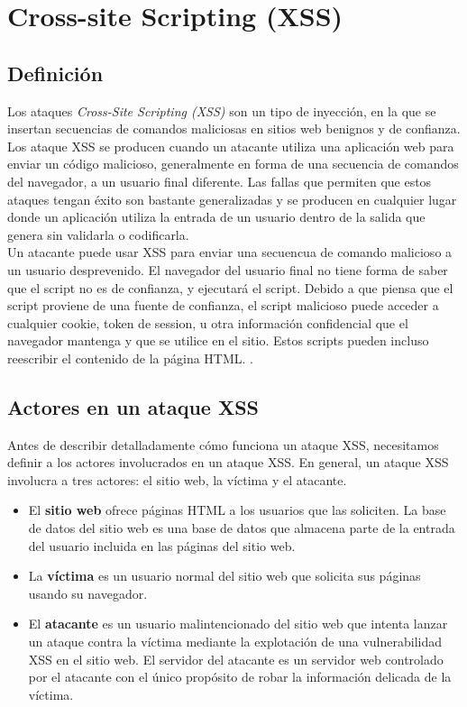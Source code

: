 \section{Cross-site Scripting (XSS)}

\subsection{Definición}

Los ataques \textit{Cross-Site Scripting (XSS)} son un tipo de inyección, en la que se insertan secuencias de comandos maliciosas en sitios web benignos y de confianza. Los ataque XSS se producen cuando un atacante utiliza una aplicación web para enviar un código malicioso, generalmente en forma de una secuencia de comandos del navegador, a un usuario final diferente. Las fallas que permiten que estos ataques tengan éxito son bastante generalizadas y se producen en cualquier lugar donde un aplicación utiliza la entrada de un usuario dentro de la salida que genera sin validarla o codificarla. \\

Un atacante puede usar XSS para enviar una secuencua de comando malicioso a un usuario desprevenido. El navegador del usuario final no tiene forma de saber que el script no es de confianza, y ejecutará el script. Debido a que piensa que el script proviene de una fuente de confianza, el script malicioso puede acceder a cualquier cookie, token de session, u otra información confidencial que el navegador mantenga y que se utilice en el sitio. Estos scripts pueden incluso reescribir el contenido de la página HTML. \cite{defxss}. \\

\subsection{Actores en un ataque XSS}

Antes de describir detalladamente cómo funciona un ataque XSS, necesitamos definir a los actores involucrados en un ataque XSS. En general, un ataque XSS involucra a tres actores: el sitio web, la víctima y el atacante. \\

\begin{itemize}

    \item El \textbf{sitio web} ofrece páginas HTML a los usuarios que las soliciten. La base de datos del sitio web es una base de datos que almacena parte de la entrada del usuario incluida en las páginas del sitio web.

    \item La \textbf{víctima} es un usuario normal del sitio web que solicita sus páginas usando su navegador.

    \item El \textbf{atacante} es un usuario malintencionado del sitio web que intenta lanzar un ataque contra la víctima mediante la explotación de una vulnerabilidad XSS en el sitio web. El servidor del atacante es un servidor web controlado por el atacante con el único propósito de robar la información delicada de la víctima.

\end{itemize}
